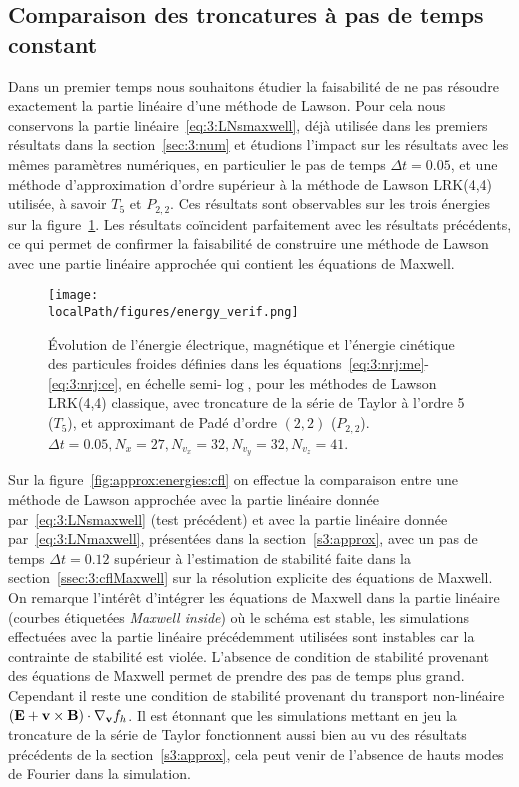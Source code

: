 \subsection{Comparaison des troncatures à pas de temps constant}

Dans un premier temps nous souhaitons étudier la faisabilité de ne pas résoudre exactement la partie linéaire d'une méthode de Lawson. Pour cela nous conservons la partie linéaire~\eqref{eq:3:LNsmaxwell}, déjà utilisée dans les premiers résultats dans la section~\ref{sec:3:num} et étudions l'impact sur les résultats avec les mêmes paramètres numériques, en particulier le pas de temps $\Delta t=0.05$, et une méthode d'approximation d'ordre supérieur à la méthode de Lawson LRK(4,4) utilisée, à savoir $T_5$ et $P_{2,2}$. Ces résultats sont observables sur les trois énergies sur la figure~\ref{fig:approx:energies4d}. Les résultats coïncident parfaitement avec les résultats précédents, ce qui permet de confirmer la faisabilité de construire une méthode de Lawson avec une partie linéaire approchée qui contient les équations de Maxwell.

\begin{figure}[h]
  \centering
  \texttt{[image: \\localPath/figures/energy\_verif.png]}
  \caption{Évolution de l'énergie électrique, magnétique et l'énergie cinétique des particules froides définies dans les équations~\ref{eq:3:nrj:me}-\ref{eq:3:nrj:ce}, en échelle semi-$\log$, pour les méthodes de Lawson LRK(4,4) classique, avec troncature de la série de Taylor à l'ordre 5 ($T_5$), et approximant de Padé d'ordre $(2,2)$ ($P_{2,2}$). $\Delta t = 0.05, N_x=27, N_{v_x}=32, N_{v_y}=32, N_{v_z}=41$.}
  \label{fig:approx:energies4d}
\end{figure}

Sur la figure~\ref{fig:approx:energies:cfl} on effectue la comparaison entre une méthode de Lawson approchée avec la partie linéaire donnée par~\eqref{eq:3:LNsmaxwell} (test précédent) et avec la partie linéaire donnée par~\eqref{eq:3:LNmaxwell}, présentées dans la section~\ref{s3:approx}, avec un pas de temps $\Delta t=0.12$ supérieur à l'estimation de stabilité faite dans la section~\ref{ssec:3:cflMaxwell} sur la résolution explicite des équations de Maxwell. On remarque l'intérêt d'intégrer les équations de Maxwell dans la partie linéaire (courbes étiquetées \emph{Maxwell inside}) où le schéma est stable, les simulations effectuées avec la partie linéaire précédemment utilisées sont instables car la contrainte de stabilité est violée. L'absence de condition de stabilité provenant des équations de Maxwell permet de prendre des pas de temps plus grand. Cependant il reste une condition de stabilité provenant du transport non-linéaire $(\vb{E}+\vb{v}\times\vb{B})\cdot\nabla_{\vb{v}}f_h$. Il est étonnant que les simulations mettant en jeu la troncature de la série de Taylor fonctionnent aussi bien au vu des résultats précédents de la section~\ref{s3:approx}, cela peut venir de l'absence de hauts modes de Fourier dans la simulation.

